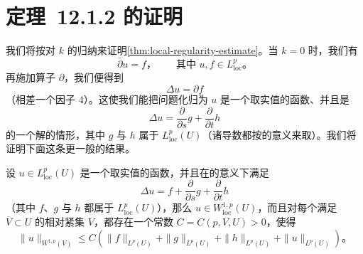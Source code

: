 
\section{定理~12.1.2 的证明}
\label{sec:proof-theorem-1212}

我们将按对 $k$ 的归纳来证明\cref{thm:local-regularity-estimate}。当 $k=0$ 时，我们有
\[
\bar{\partial}u=f\text{，}\qquad\text{其中 }u,f\in L^{p}_{\mathrm{loc}}\text{。}
\]
再施加算子 $\partial$，我们便得到
\[
\Delta u=\partial f
\]
（相差一个因子 $4$）。这使我们能把问题化归为 $u$ 是一个取实值的函数、并且是
\[
\Delta u=\frac{\partial}{\partial s}g+\frac{\partial}{\partial t}h
\]
的一个解的情形，其中 $g$ 与 $h$ 属于 $L^{p}_{\mathrm{loc}}(U)$（诸导数都按\trDistribution{}的意义来取）。我们将证明下面这条更一般的结果。

\begin{proposition}\label{thm:bar-partial-regularity-criterion}
设 $u\in L^{p}_{\mathrm{loc}}(U)$ 是一个取实值的函数，并且在\trDistribution{}的意义下满足
\[
\Delta u=f+\frac{\partial}{\partial s}g+\frac{\partial}{\partial t}h
\]
（其中 $f$、$g$ 与 $h$ 都属于 $L^{p}_{\mathrm{loc}}(U)$），那么 $u\in W^{1,p}_{\mathrm{loc}}(U)$，而且对每个满足 $\overline{V}\subset U$ 的相对紧\trOpen{}集 $V$，都存在一个常数 $C=C(p,V,U)>0$，使得
\[
\|u\|_{W^{1,p}(V)}\le C\left(\|f\|_{L^{p}(U)}+\|g\|_{L^{p}(U)}+\|h\|_{L^{p}(U)}+\|u\|_{L^{p}(U)}\right)\text{。}
\]
\end{proposition}


